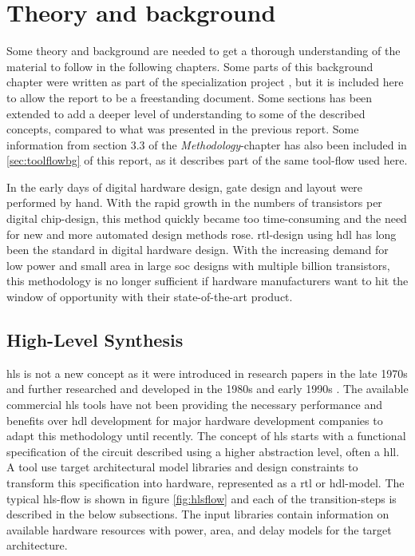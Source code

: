 \chapter{\label{chp:background}Theory and background}
Some theory and background are needed to get a thorough understanding of the material to follow in the following chapters. Some parts of this background chapter were written as part of the specialization project \cite{holm2015pro}, but it is included here to allow the report to be a freestanding document. Some sections has been extended to add a deeper level of understanding to some of the described concepts, compared to what was presented in the previous report. Some information from section 3.3 of the \textit{Methodology}-chapter has also been included in \cref{sec:toolflowbg} of this report, as it describes part of the same tool-flow used here.

In the early days of digital hardware design, gate design and layout were performed by hand. With the rapid growth in the numbers of transistors per digital chip-design, this method quickly became too time-consuming and the need for new and more automated design methods rose. \gls{rtl}-design using \gls{hdl} has long been the standard in digital hardware design. With the increasing demand for low power and small area in large \gls{soc} designs with multiple billion transistors, this methodology is no longer sufficient if hardware manufacturers want to hit the window of opportunity with their state-of-the-art product.

\section{\label{sec:hls}High-Level Synthesis}

\gls{hls} is not a new concept as it were introduced in research papers in the late 1970s and further researched and developed in the 1980s and early 1990s \cite{martin2009high}. The available commercial \gls{hls} tools have not been providing the necessary performance and benefits over \gls{hdl} development for major hardware development companies to adapt this methodology until recently.
The concept of \gls{hls} starts with a functional specification of the circuit described using a higher abstraction level, often a \gls{hll}. A tool use target architectural model libraries and design constraints to transform this specification into hardware, represented as a \gls{rtl} or \gls{hdl}-model. The typical \gls{hls}-flow is shown in figure \ref{fig:hlsflow} and each of the transition-steps is described in the below subsections. The input libraries contain information on available hardware resources with power, area, and delay models for the target architecture.

